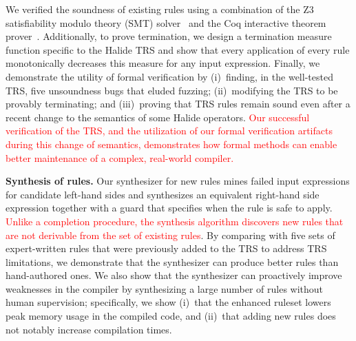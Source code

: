 \documentclass[acmsmall,review,anonymous]{acmart}\settopmatter{printfolios=true,printccs=false,printacmref=false}
\newcommand{\modified}[1]{\textcolor{red}{{#1}}}
\begin{document}
We verified the soundness of existing rules using a combination of the Z3
satisfiability modulo theory (SMT) solver~\cite{de2008z3} and the Coq
interactive theorem prover~\cite{coq19}.  Additionally, to prove termination, we
design a termination measure function specific to the Halide TRS and show that every
application of every rule monotonically decreases this measure for any input
expression.  Finally, we demonstrate the utility of formal
verification by (i)~finding, in the well-tested TRS,  five unsoundness bugs that eluded fuzzing;
(ii)~modifying the TRS to be provably terminating; and (iii)~proving that TRS
rules remain sound even after a recent change to the semantics of some Halide
operators.  \modified{Our successful verification of the TRS, and the utilization
  of our formal verification artifacts during this change of semantics, demonstrates
  how formal methods can enable better maintenance of a complex, real-world compiler.}

\textbf{Synthesis of rules.}  Our synthesizer for new rules mines failed input
expressions for candidate left-hand sides and synthesizes an equivalent
right-hand side expression together with a guard that specifies when the rule is
safe to apply. \modified{Unlike a completion procedure, the synthesis algorithm discovers new rules that
  are not derivable from the set of existing rules}.
By comparing with five sets of expert-written rules that were
previously added to the TRS to address TRS limitations, we demonstrate that the
synthesizer can produce better rules than hand-authored
ones.  We also show that the synthesizer can proactively improve weaknesses in
the compiler by synthesizing a large number of rules without human supervision;
specifically, we show (i)~that the enhanced ruleset lowers peak memory usage in
the compiled code, and (ii)~that adding new rules does not notably increase
compilation times.
\end{document}
